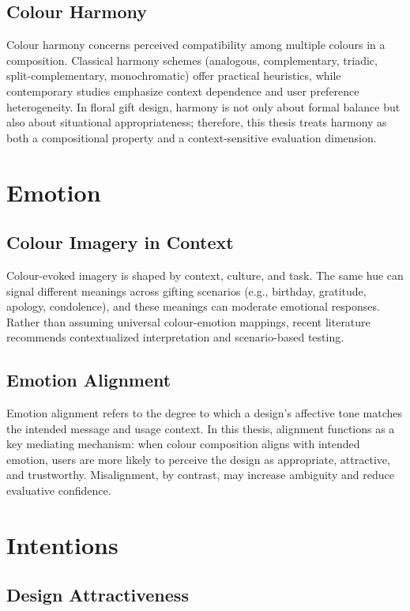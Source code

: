 \subsection{Colour Harmony}

Colour harmony concerns perceived compatibility among multiple colours in a composition. Classical harmony schemes (analogous, complementary, triadic, split-complementary, monochromatic) offer practical heuristics, while contemporary studies emphasize context dependence and user preference heterogeneity. In floral gift design, harmony is not only about formal balance but also about situational appropriateness; therefore, this thesis treats harmony as both a compositional property and a context-sensitive evaluation dimension.

\section{Emotion}

\subsection{Colour Imagery in Context}

Colour-evoked imagery is shaped by context, culture, and task. The same hue can signal different meanings across gifting scenarios (e.g., birthday, gratitude, apology, condolence), and these meanings can moderate emotional responses. Rather than assuming universal colour-emotion mappings, recent literature recommends contextualized interpretation and scenario-based testing.

\subsection{Emotion Alignment}

Emotion alignment refers to the degree to which a design's affective tone matches the intended message and usage context. In this thesis, alignment functions as a key mediating mechanism: when colour composition aligns with intended emotion, users are more likely to perceive the design as appropriate, attractive, and trustworthy. Misalignment, by contrast, may increase ambiguity and reduce evaluative confidence.

\section{Intentions}

\subsection{Design Attractiveness}

